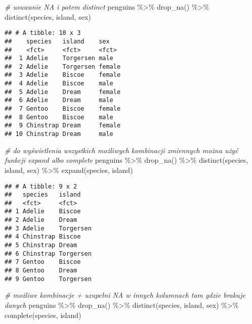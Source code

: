 \documentclass[
]{book}
\newenvironment{Shaded}{\begin{snugshade}}{\end{snugshade}}
\newcommand{\CommentTok}[1]{\textcolor[rgb]{0.56,0.35,0.01}{\textit{#1}}}
\newcommand{\FunctionTok}[1]{\textcolor[rgb]{0.00,0.00,0.00}{#1}}
\newcommand{\NormalTok}[1]{#1}
\newcommand{\SpecialCharTok}[1]{\textcolor[rgb]{0.00,0.00,0.00}{#1}}
\begin{document}
\begin{Shaded}
\begin{Highlighting}[]
\CommentTok{\# usuwanie NA i potem distinct}
\NormalTok{penguins }\SpecialCharTok{\%\textgreater{}\%} \FunctionTok{drop\_na}\NormalTok{() }\SpecialCharTok{\%\textgreater{}\%} \FunctionTok{distinct}\NormalTok{(species, island, sex)}
\end{Highlighting}
\end{Shaded}

\begin{verbatim}
## # A tibble: 10 x 3
##    species   island    sex   
##    <fct>     <fct>     <fct> 
##  1 Adelie    Torgersen male  
##  2 Adelie    Torgersen female
##  3 Adelie    Biscoe    female
##  4 Adelie    Biscoe    male  
##  5 Adelie    Dream     female
##  6 Adelie    Dream     male  
##  7 Gentoo    Biscoe    female
##  8 Gentoo    Biscoe    male  
##  9 Chinstrap Dream     female
## 10 Chinstrap Dream     male
\end{verbatim}

\begin{Shaded}
\begin{Highlighting}[]
\CommentTok{\# do wyświetlenia wszystkich możliwych kombinacji zmiennych można użyć funkcji expand albo complete}
\NormalTok{penguins }\SpecialCharTok{\%\textgreater{}\%} \FunctionTok{drop\_na}\NormalTok{() }\SpecialCharTok{\%\textgreater{}\%} \FunctionTok{distinct}\NormalTok{(species, island, sex) }\SpecialCharTok{\%\textgreater{}\%} \FunctionTok{expand}\NormalTok{(species, island)}
\end{Highlighting}
\end{Shaded}

\begin{verbatim}
## # A tibble: 9 x 2
##   species   island   
##   <fct>     <fct>    
## 1 Adelie    Biscoe   
## 2 Adelie    Dream    
## 3 Adelie    Torgersen
## 4 Chinstrap Biscoe   
## 5 Chinstrap Dream    
## 6 Chinstrap Torgersen
## 7 Gentoo    Biscoe   
## 8 Gentoo    Dream    
## 9 Gentoo    Torgersen
\end{verbatim}

\begin{Shaded}
\begin{Highlighting}[]
\CommentTok{\# możliwe kombinacje + uzupełni NA w innych kolumnach tam gdzie brakuje danych}
\NormalTok{penguins }\SpecialCharTok{\%\textgreater{}\%} \FunctionTok{drop\_na}\NormalTok{() }\SpecialCharTok{\%\textgreater{}\%} \FunctionTok{distinct}\NormalTok{(species, island, sex) }\SpecialCharTok{\%\textgreater{}\%} \FunctionTok{complete}\NormalTok{(species, island) }
\end{Highlighting}
\end{Shaded}
\end{document}
